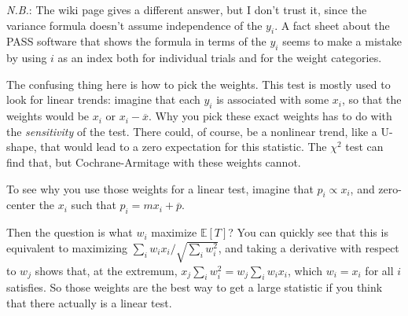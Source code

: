 \emph{N.B.}: The wiki page gives a different answer, but I don't trust
it, since the variance formula doesn't assume independence of the
\(y_i\). A fact sheet about the PASS software that shows the formula in
terms of the \(y_i\) seems to make a mistake by using \(i\) as an index
both for individual trials and for the weight categories.

The confusing thing here is how to pick the weights. This test is mostly
used to look for linear trends: imagine that each \(y_i\) is associated
with some \(x_i\), so that the weights would be \(x_i\) or
\(x_i - \overline{x}\). Why you pick these exact weights has to do with
the \emph{sensitivity} of the test. There could, of course, be a
nonlinear trend, like a U-shape, that would lead to a zero expectation
for this statistic. The \(\chi^2\) test can find that, but
Cochrane-Armitage with these weights cannot.

To see why you use those weights for a linear test, imagine that
\(p_i \propto x_i\), and zero-center the \(x_i\) such that
\(p_i = m x_i + \overline{p}\).

Then the question is what \(w_i\) maximize \(\mathbb{E}[T]\)? You can
quickly see that this is equivalent to maximizing
\(\sum_i w_i x_i / \sqrt{\sum_i w_i^2}\), and taking a derivative with
respect to \(w_j\) shows that, at the extremum,
\(x_j \sum_i w_i^2 = w_j \sum_i w_i x_i\), which \(w_i = x_i\) for all
\(i\) satisfies. So those weights are the best way to get a large
statistic if you think that there actually is a linear test.
